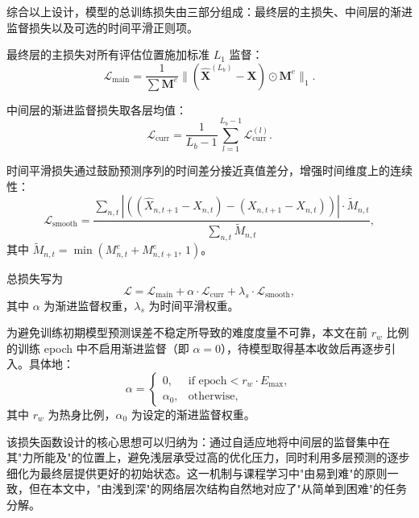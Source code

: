 综合以上设计，模型的总训练损失由三部分组成：最终层的主损失、中间层的渐进监督损失以及可选的时间平滑正则项。

最终层的主损失对所有评估位置施加标准 $L_1$ 监督：
\begin{equation}
\mathcal{L}_{\mathrm{main}} = \frac{1}{\sum \mathbf{M}^{e}} \bigl\|(\hat{\mathbf{X}}^{(L_b)} - \mathbf{X}) \odot \mathbf{M}^{e}\bigr\|_1.
\end{equation}

中间层的渐进监督损失取各层均值：
\begin{equation}
\mathcal{L}_{\mathrm{curr}} = \frac{1}{L_b - 1}\sum_{l=1}^{L_b-1} \mathcal{L}^{(l)}_{\mathrm{curr}}.
\end{equation}

时间平滑损失通过鼓励预测序列的时间差分接近真值差分，增强时间维度上的连续性：
\begin{equation}
\mathcal{L}_{\mathrm{smooth}} = \frac{\sum_{n,t} |((\hat{X}_{n,t+1}-\hat{X}_{n,t})-(X_{n,t+1}-X_{n,t}))| \cdot \tilde{M}_{n,t}}{\sum_{n,t} \tilde{M}_{n,t}},
\end{equation}
其中 $\tilde{M}_{n,t} = \min(M^{e}_{n,t} + M^{e}_{n,t+1},\, 1)$。

总损失写为
\begin{equation}\label{eq:total_loss}
\mathcal{L} = \mathcal{L}_{\mathrm{main}} + \alpha \cdot \mathcal{L}_{\mathrm{curr}} + \lambda_s \cdot \mathcal{L}_{\mathrm{smooth}},
\end{equation}
其中 $\alpha$ 为渐进监督权重，$\lambda_s$ 为时间平滑权重。

为避免训练初期模型预测误差不稳定所导致的难度度量不可靠，本文在前 $r_w$ 比例的训练 epoch 中不启用渐进监督（即 $\alpha=0$），待模型取得基本收敛后再逐步引入。具体地：
\begin{equation}
\alpha = \begin{cases}
0, & \text{if } \mathrm{epoch} < r_w \cdot E_{\max}, \\
\alpha_0, & \text{otherwise},
\end{cases}
\end{equation}
其中 $r_w$ 为热身比例，$\alpha_0$ 为设定的渐进监督权重。

该损失函数设计的核心思想可以归纳为：通过自适应地将中间层的监督集中在其"力所能及"的位置上，避免浅层承受过高的优化压力，同时利用多层预测的逐步细化为最终层提供更好的初始状态。这一机制与课程学习中"由易到难"的原则一致，但在本文中，"由浅到深"的网络层次结构自然地对应了"从简单到困难"的任务分解。
